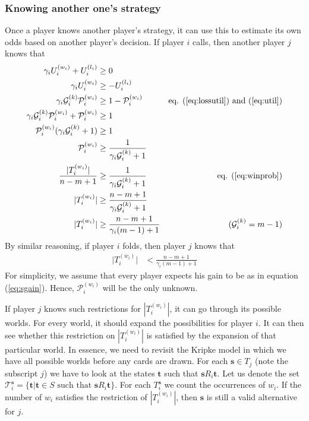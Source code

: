 \documentclass[a4paper,10pt]{article}
\begin{document}
\subsubsection{Knowing another one's strategy}
Once a player knows another player's strategy, it can use this to estimate its own odds based on another player's decision. If player $i$ calls, then another player $j$ knows that 
\begin{align*}
\gamma_i U^{(w_i)}_i + U^{(l_i)}_i &\geq 0\\
\gamma_i U^{(w_i)}_i &\geq -U^{(l_i)}_i\\
\gamma_i \mathcal G^{(k)}_i \mathcal P^{(w_i)}_i &\geq 1 - \mathcal{P}_i^{(w_i)} & \text{eq. (\ref{eq:lossutil}) and (\ref{eq:util})}\\
\gamma_i \mathcal G^{(k)}_i \mathcal P^{(w_i)}_i + \mathcal{P}_i^{(w_i)} &\geq 1 \\
\mathcal{P}_i^{(w_i)}  (\gamma_i \mathcal G^{(k)}_i + 1) &\geq 1 \\
\mathcal{P}_i^{(w_i)} &\geq \frac{1}{\gamma_i \mathcal G^{(k)}_i + 1}\\
\frac{\lvert T^{(w_i)}_i\rvert}{n-m+1} &\geq \frac{1}{\gamma_i \mathcal G^{(k)}_i + 1} & \text{eq. (\ref{eq:winprob})}\\
\lvert T^{(w_i)}_i\rvert&\geq \frac{n-m+1}{\gamma_i \mathcal G^{(k)}_i + 1}\\
\lvert T^{(w_i)}_i\rvert&\geq \frac{n-m+1}{\gamma_i (m-1) + 1} & (\mathcal G^{(k)}_i = m-1)
\end{align*}
By similar reasoning, if player $i$ folds, then player $j$ knows that
\begin{align*}
\lvert T^{(w_i)}_i\rvert&<\frac{n-m+1}{\gamma_i (m-1) + 1} 
\end{align*}
For simplicity, we assume that every player expects his gain to be as in equation (\ref{eq:sgain}). Hence, $\mathcal{P}_i^{(w_i)}$ will be the only unknown.

If player $j$ knows such restrictions for $|T^{(w_i)}_i|$, it can go through its possible worlds. For every world, it should expand the possibilities for player $i$. It can then see whether this restriction on $|T^{(w_i)}_i|$ is satisfied by the expansion of that particular world. In essence, we need to revisit the Kripke model in which we have all possible worlds before any cards are drawn. For each $\boldsymbol s \in T_j$ (note the subscript $j$) we have to look at the states $\boldsymbol t$ such that $\boldsymbol s R_i \boldsymbol t$. Let us denote the set $\mathcal T^{\boldsymbol s}_i = \{\boldsymbol t | \boldsymbol t \in S \text{ such that } \boldsymbol s R_i \boldsymbol t \}$. For each $T^{\boldsymbol s}_i$ we count the occurrences of $w_i$. If the number of $w_i$ satisfies the restriction of $|T^{(w_i)}_i|$, then $\boldsymbol s$ is still a valid alternative for $j$. 
\end{document}
